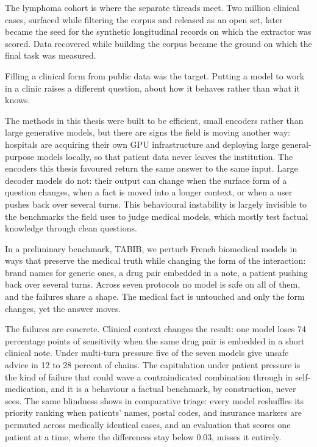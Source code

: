 The lymphoma cohort is where the separate threads meet. Two million clinical cases,
surfaced while filtering the corpus and released as an open set, later became the
seed for the synthetic longitudinal records on which the extractor was scored. Data
recovered while building the corpus became the ground on which the final task was
measured.

Filling a clinical form from public data was the target. Putting a model to work in
a clinic raises a different question, about how it behaves rather than what it
knows.

The methods in this thesis were built to be efficient, small encoders rather than
large generative models, but there are signs the field is moving another way:
hospitals are acquiring their own GPU infrastructure and deploying large
general-purpose models locally, so that patient data never leaves the institution.
The encoders this thesis favoured return the same answer to the same input. Large
decoder models do not: their output can change when the surface form of a question
changes, when a fact is moved into a longer context, or when a user pushes back over
several turns. This behavioural instability is largely invisible to the benchmarks
the field uses to judge medical models, which mostly test factual knowledge through
clean questions.

In a preliminary benchmark, TABIB, we perturb French biomedical models in
ways that preserve the medical truth while changing the form of the interaction:
brand names for generic ones, a drug pair embedded in a note, a patient pushing
back over several turns. Across seven protocols no model is safe on all of them,
and the failures share a shape. The
medical fact is untouched and only the form changes, yet the answer moves.

The failures are concrete. Clinical context changes the result: one model loses 74
percentage points of sensitivity when the same drug pair is embedded in a short
clinical note. Under multi-turn pressure five of the seven models give unsafe advice
in 12 to 28 percent of chains. The capitulation under patient pressure is the kind of failure that
could wave a contraindicated combination through in self-medication, and it is a
behaviour a factual benchmark, by construction, never sees. The same blindness shows
in comparative triage: every model reshuffles its priority ranking when patients'
names, postal codes, and insurance markers are permuted across medically identical
cases, and an evaluation that scores one patient at a time, where the differences stay
below 0.03, misses it entirely.


